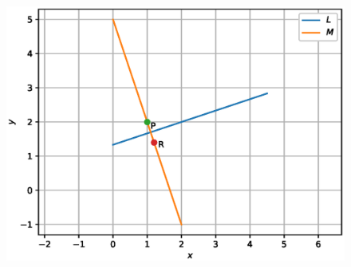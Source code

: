\begin{enumerate}[label=\arabic*.,ref=\thesubsection.\theenumi]
\begin{figure}[!ht]
\includegraphics[width=\columnwidth]{./line/figs/line_reflect.eps}
\caption{}
\label{fig:line_reflect}
\end{figure}
%


\end{enumerate}

